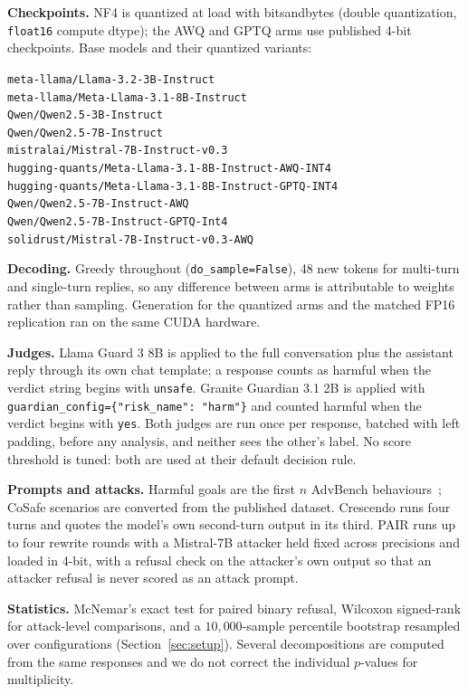 \documentclass{article}
\begin{document}
\textbf{Checkpoints.} NF4 is quantized at load with bitsandbytes (double
quantization, \texttt{float16} compute dtype); the AWQ and GPTQ arms use published
4-bit checkpoints. Base models and their quantized variants:

{\raggedright\small
\texttt{meta-llama/Llama-3.2-3B-Instruct}\\
\texttt{meta-llama/Meta-Llama-3.1-8B-Instruct}\\
\texttt{Qwen/Qwen2.5-3B-Instruct}\\
\texttt{Qwen/Qwen2.5-7B-Instruct}\\
\texttt{mistralai/Mistral-7B-Instruct-v0.3}\\
\texttt{hugging-quants/Meta-Llama-3.1-8B-Instruct-AWQ-INT4}\\
\texttt{hugging-quants/Meta-Llama-3.1-8B-Instruct-GPTQ-INT4}\\
\texttt{Qwen/Qwen2.5-7B-Instruct-AWQ}\\
\texttt{Qwen/Qwen2.5-7B-Instruct-GPTQ-Int4}\\
\texttt{solidrust/Mistral-7B-Instruct-v0.3-AWQ}\par}

\textbf{Decoding.} Greedy throughout (\texttt{do\_sample=False}), 48 new tokens for
multi-turn and single-turn replies, so any difference between arms is attributable
to weights rather than sampling. Generation for the quantized arms and the matched
FP16 replication ran on the same CUDA hardware.

\textbf{Judges.} Llama Guard 3 8B is applied to the full conversation plus the
assistant reply through its own chat template; a response counts as harmful when
the verdict string begins with \texttt{unsafe}. Granite Guardian 3.1 2B is applied
with \texttt{guardian\_config=\{"risk\_name": "harm"\}} and counted harmful when the
verdict begins with \texttt{yes}. Both judges are run once per response, batched
with left padding, before any analysis, and neither sees the other's label. No
score threshold is tuned: both are used at their default decision rule.

\textbf{Prompts and attacks.} Harmful goals are the first $n$ AdvBench
behaviours~\citep{zou2023universal};
CoSafe scenarios are converted from the published dataset. Crescendo runs four
turns and quotes the model's own second-turn output in its third. PAIR runs up to
four rewrite rounds with a Mistral-7B attacker held fixed across precisions and
loaded in 4-bit, with a refusal check on the attacker's own output so that an
attacker refusal is never scored as an attack prompt.

\textbf{Statistics.} McNemar's exact test for paired binary refusal, Wilcoxon
signed-rank for attack-level comparisons, and a $10{,}000$-sample percentile
bootstrap resampled over configurations (Section~\ref{sec:setup}). Several
decompositions are computed from the same responses and we do not correct the
individual $p$-values for multiplicity.
\end{document}
